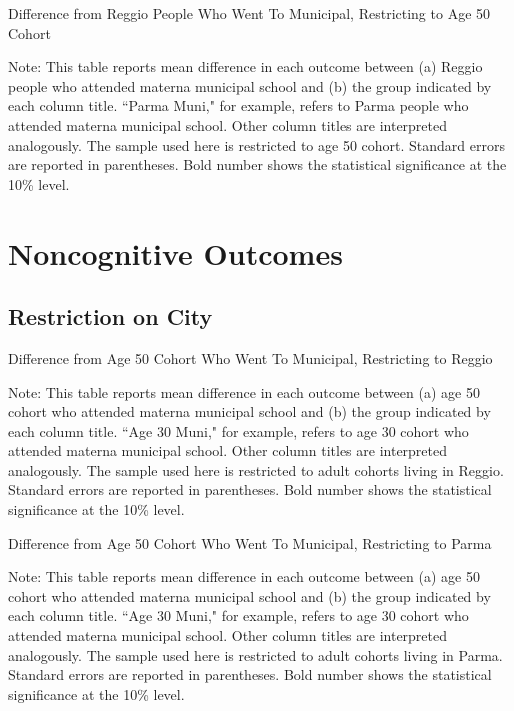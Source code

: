 \documentclass[11pt]{article}
\begin{document}
\begin{table}[H]
\begin{center}
	\caption{Difference from Reggio People Who Went To Municipal, Restricting to Age 50 Cohort}
	\scalebox{0.83}{
		}
\end{center}
\footnotesize
Note: This table reports mean difference in each outcome between (a) Reggio people who attended materna municipal school and (b) the group indicated by each column title. ``Parma Muni," for example, refers to Parma people who attended materna municipal school. Other column titles are interpreted analogously. The sample used here is restricted to age 50 cohort. Standard errors are reported in parentheses. Bold number shows the statistical significance at the 10\% level. 
\end{table}






\section{Noncognitive Outcomes}
\subsection{Restriction on City}
\begin{table}[H]
\begin{center}
	\caption{Difference from Age 50 Cohort Who Went To Municipal, Restricting to Reggio}
	\scalebox{0.83}{
		}
\end{center}
\footnotesize
Note: This table reports mean difference in each outcome between (a) age 50 cohort who attended materna municipal school and (b) the group indicated by each column title. ``Age 30 Muni," for example, refers to age 30 cohort who attended materna municipal school. Other column titles are interpreted analogously. The sample used here is restricted to adult cohorts living in Reggio. Standard errors are reported in parentheses. Bold number shows the statistical significance at the 10\% level. 
\end{table}

\begin{table}[H]
\begin{center}
	\caption{Difference from Age 50 Cohort Who Went To Municipal, Restricting to Parma}
	\scalebox{0.83}{
		}
\end{center}
\footnotesize
Note: This table reports mean difference in each outcome between (a) age 50 cohort who attended materna municipal school and (b) the group indicated by each column title. ``Age 30 Muni," for example, refers to age 30 cohort who attended materna municipal school. Other column titles are interpreted analogously. The sample used here is restricted to adult cohorts living in Parma. Standard errors are reported in parentheses. Bold number shows the statistical significance at the 10\% level. 
\end{table}
\end{document}
